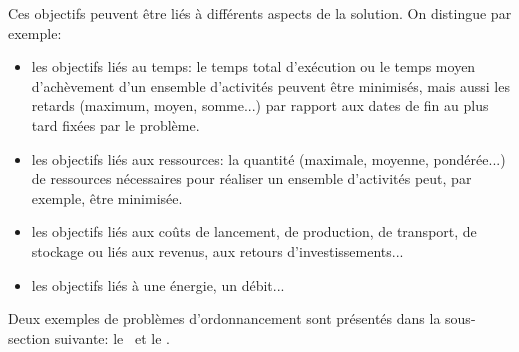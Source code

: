 Ces objectifs peuvent être liés à différents aspects de la solution. On
distingue par exemple:
\begin{itemize}
\item les objectifs liés au temps: le temps total d'exécution ou le temps moyen
  d'achèvement d'un ensemble d'activités peuvent être minimisés, mais
  aussi  les retards (maximum, moyen, somme...) par rapport
  aux dates de fin au plus tard fixées par le problème.
\item les objectifs liés aux ressources: la quantité (maximale,
  moyenne, pondérée...) de ressources nécessaires pour réaliser un
  ensemble d'activités peut, par exemple, être minimisée.
\item les objectifs liés aux coûts de lancement, de production, de
  transport, de stockage ou liés aux revenus, aux retours
  d'investissements... 
\item les objectifs liés à une énergie, un débit...
\end{itemize}

Deux exemples de problèmes d'ordonnancement sont présentés dans la
sous-section suivante: le \RCPSP~et le \CUSP. 